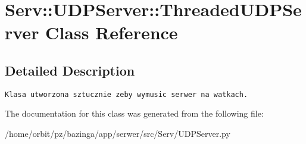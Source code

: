 \hypertarget{class_serv_1_1_u_d_p_server_1_1_threaded_u_d_p_server}{
\section{Serv::UDPServer::ThreadedUDPServer Class Reference}
\label{class_serv_1_1_u_d_p_server_1_1_threaded_u_d_p_server}
}


\subsection{Detailed Description}


\footnotesize\begin{verbatim}Klasa utworzona sztucznie zeby wymusic serwer na watkach.\end{verbatim}
\normalsize
 

The documentation for this class was generated from the following file:\begin{CompactItemize}
\item 
/home/orbit/pz/bazinga/app/serwer/src/Serv/UDPServer.py\end{CompactItemize}
